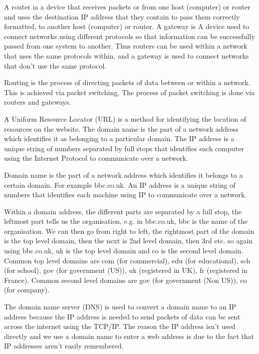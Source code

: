   A router ia a device that receives packets or from one host (computer) or router and uses the destination IP address that they contain to pass them correctly formatted, to another host (computer) or router. A gateway is A device used to connect networks using different protocols so that information can be successfully passed from one system to another. Thus routers can be used within a network that uses the same protocols within, and a gateway is used to connect networks that don't use the same protocol.
  
  Routing is the process of directing packets of data between or within a network. This is achieved via packet switching, The process of packet switching is done via routers and gateways.
  
  A Uniform Resource Locator (URL) is a method for identifying the location of resources on the website. The domain name is the part of a network address which identifies it as belonging to a particular domain. The IP address is a unique string of numbers separated by full stops that identifies each computer using the Internet Protocol to communicate over a network.
  
  Domain name is the part of a network address which identifies it belongs to a certain domain. For example bbc.co.uk. An IP address is a unique string of numbers that identifies each machine using IP to communicate over a network.
  
  Within a domain address, the different parts are separated by a full stop, the leftmost part tells us the organisation, e.g. in bbc.co.uk, bbc is the name of the organisation. We can then go from right to left, the rightmost part of the domain is the top level domain, then the next is 2nd level domain, then 3rd etc. so again using bbc.co.uk, uk is the top level domain and co is the second level domain. Common top level domains are com (for commercial), edu (for educational), sch (for school), gov (for government (US)), uk (registered in UK), fr (registered in France). Common second level domains are gov (for government (Non US)), co (for company).
  
  The domain name server (DNS) is used to convert a domain name to an IP address because the IP address is needed to send packets of data can be sent across the internet using the TCP/IP. The reason the IP address isn't used directly and we use a domain name to enter a web address is due to the fact that IP addresses aren't easily remembered.
  
